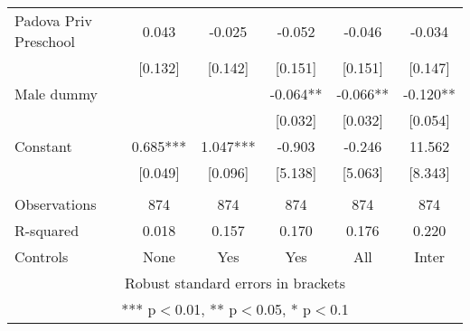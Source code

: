 \begin{tabular}{lccccc}
Padova Priv Preschool & 0.043 & -0.025 & -0.052 & -0.046 & -0.034 \\
 & [0.132] & [0.142] & [0.151] & [0.151] & [0.147] \\
Male dummy &  &  & -0.064** & -0.066** & -0.120** \\
 &  &  & [0.032] & [0.032] & [0.054] \\
Constant & 0.685*** & 1.047*** & -0.903 & -0.246 & 11.562 \\
 & [0.049] & [0.096] & [5.138] & [5.063] & [8.343] \\
 &  &  &  &  &  \\
Observations & 874 & 874 & 874 & 874 & 874 \\
R-squared & 0.018 & 0.157 & 0.170 & 0.176 & 0.220 \\
 Controls & None & Yes & Yes & All & Inter \\ \hline
\multicolumn{6}{c}{ Robust standard errors in brackets} \\
\multicolumn{6}{c}{ *** p$<$0.01, ** p$<$0.05, * p$<$0.1} \\
\end{tabular}
